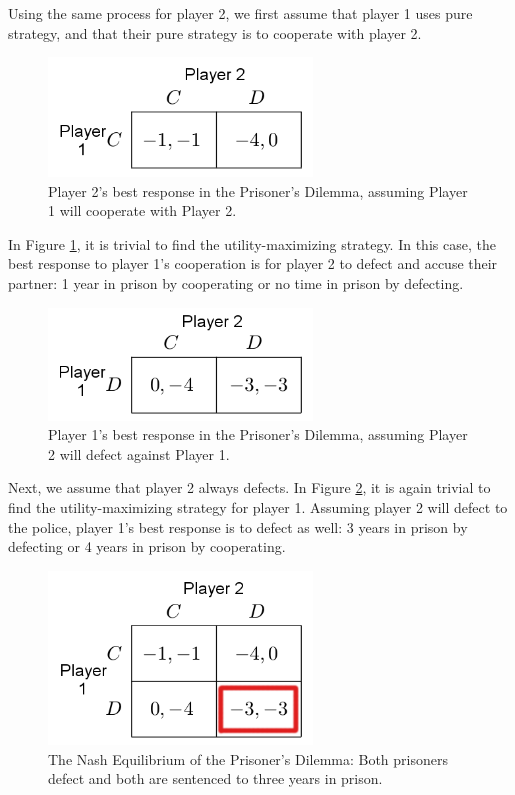 Using the same process for player 2, we first assume that player 1 uses pure strategy, and that their pure strategy is to cooperate with player 2.
\begin{figure}[H]
  \centering
  \includegraphics[width=7cm]{figures/ExamplePartialRow1.png}
  \caption{Player 2's best response in the Prisoner's Dilemma, assuming Player 1 will cooperate with Player 2.}
  \label{fig:NashRow1}
\end{figure}

In Figure \ref{fig:NashRow1}, it is trivial to find the utility-maximizing strategy. In this case, the best response to player 1's cooperation is for player 2 to defect and accuse their partner: 1 year in prison by cooperating or no time in prison by defecting.\\

\begin{figure}[H]
  \centering
  \includegraphics[width=7cm]{figures/ExamplePartialRow2.png}
  \caption{Player 1's best response in the Prisoner's Dilemma, assuming Player 2 will defect against Player 1.}
  \label{fig:NashRow2}
\end{figure}
Next, we assume that player 2 always defects. In Figure \ref{fig:NashRow2}, it is again trivial to find the utility-maximizing strategy for player 1. Assuming player 2 will defect to the police, player 1's best response is to defect as well: 3 years in prison by defecting or 4 years in prison by cooperating.\\

\begin{figure}[H]
  \centering
  \includegraphics[width=7cm]{figures/ExampleNashEquilibrium.png}
  \caption{The Nash Equilibrium of the Prisoner's Dilemma: Both prisoners defect and both are sentenced to three years in prison.}
  \label{fig:NashEquil}
\end{figure}

